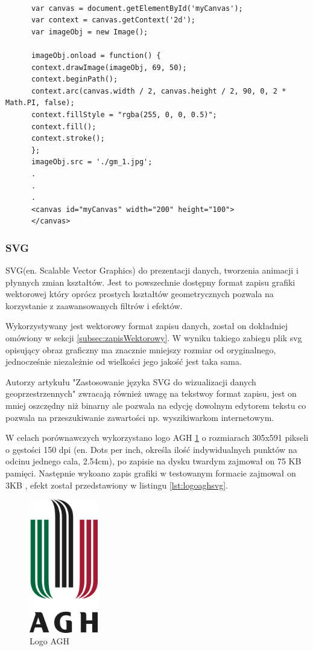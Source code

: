 \lstset{language=JavaScript}
\begin{lstlisting}[label={lst:canvas},caption={json}]

      var canvas = document.getElementById('myCanvas');
      var context = canvas.getContext('2d');
      var imageObj = new Image();
	
      imageObj.onload = function() {
      context.drawImage(imageObj, 69, 50);
	  context.beginPath();
      context.arc(canvas.width / 2, canvas.height / 2, 90, 0, 2 * Math.PI, false);
      context.fillStyle = "rgba(255, 0, 0, 0.5)";
      context.fill();
      context.stroke();
      };
      imageObj.src = './gm_1.jpg';
      .
      .
      .
      <canvas id="myCanvas" width="200" height="100">
      </canvas>
\end{lstlisting}

\subsubsection{SVG}
\label{subsubsec:svg}

SVG(en. Scalable Vector Graphics) do prezentacji danych, tworzenia animacji i płynnych zmian kształtów. Jest to powszechnie dostępny format zapisu grafiki wektorowej który oprócz prostych kształtów geometrycznych pozwala na korzystanie z zaawansowanych filtrów i efektów.

Wykorzystywany jest wektorowy format zapisu danych, został on dokładniej omówiony w sekcji \ref{subsec:zapisWektorowy}.
W wyniku takiego zabiegu plik svg opisujący obraz graficzny ma znacznie mniejszy rozmiar od oryginalnego, jednocześnie niezależnie od wielkości jego jakość jest taka sama.

Autorzy artykułu "Zastosowanie języka SVG do wizualizacji danych geoprzestrzennych" \cite{svgUse} zwracają również uwagę na tekstwoy format zapisu, jest on mniej oszczędny niż binarny ale pozwala na edycję dowolnym edytorem tekstu co pozwala na przeszukiwanie zawartości np. wyszikiwarkom internetowym.

W celach porównawczych wykorzystano logo AGH \ref{fig:aghlogo} o rozmiarach 305x591 pikseli o gęstości 150 dpi (en. Dots per inch, określa ilość indywidualnych punktów na odcinu jednego cala, 2.54cm), po zapisie na dysku twardym zajmował on 75 KB pamięci. Następnie wykoano zapis grafiki w testowanym formacie zajmował on 3KB , efekt został przedstawiony w listingu \ref{lst:logoaghsvg}.



\begin{figure}[H]
  \centering
    \includegraphics[width=30mm]{ge/agh_logo.jpg}
  \caption{Logo AGH}
  \label{fig:aghlogo}
\end{figure}

